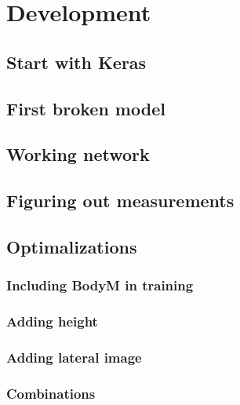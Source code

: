 \chapter{Development}
\section{Start with Keras}
\section{First broken model}
\section{Working network}
\section{Figuring out measurements}
\section{Optimalizations}
\subsection{Including BodyM in training}
\subsection{Adding height}
\subsection{Adding lateral image}
\subsection{Combinations}


